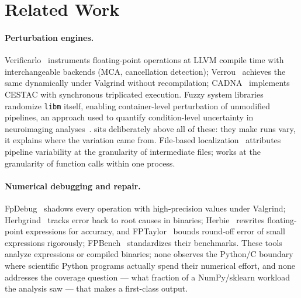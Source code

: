 \section{Related Work}
\label{sec:related}

\paragraph{Perturbation engines.}
Verificarlo~\citep{denis2016verificarlo} instruments floating-point
operations at LLVM compile time with interchangeable backends (MCA,
cancellation detection); Verrou~\citep{fevotte2017verrou} achieves the
same dynamically under Valgrind without recompilation;
CADNA~\citep{jezequel2008cadna} implements CESTAC with synchronous
triplicated execution. Fuzzy system libraries randomize \texttt{libm}
itself, enabling container-level perturbation of unmodified pipelines,
an approach used to quantify condition-level uncertainty in neuroimaging
analyses~\citep{kiar2021comparing}. \pyt{} sits deliberately above all of
these: they make runs vary, it explains where the variation came from.
File-based localization~\citep{salari2020spot} attributes pipeline
variability at the granularity of intermediate files; \pyt{} works at the
granularity of function calls within one process.

\paragraph{Numerical debugging and repair.}
FpDebug~\citep{benz2012fpdebug} shadows every operation with
high-precision values under Valgrind;
Herbgrind~\citep{sanchezstern2018herbgrind} tracks error back to root
causes in binaries; Herbie~\citep{panchekha2015herbie} rewrites
floating-point expressions for accuracy, and
FPTaylor~\citep{solovyev2015rigorous} bounds round-off error of small
expressions rigorously; FPBench~\citep{damouche2017fpbench} standardizes
their benchmarks. These tools analyze expressions or compiled binaries;
none observes the Python/C boundary where scientific Python programs
actually spend their numerical effort, and none addresses the coverage
question --- what fraction of a NumPy/sklearn workload the analysis saw
--- that \pyt{} makes a first-class output.

